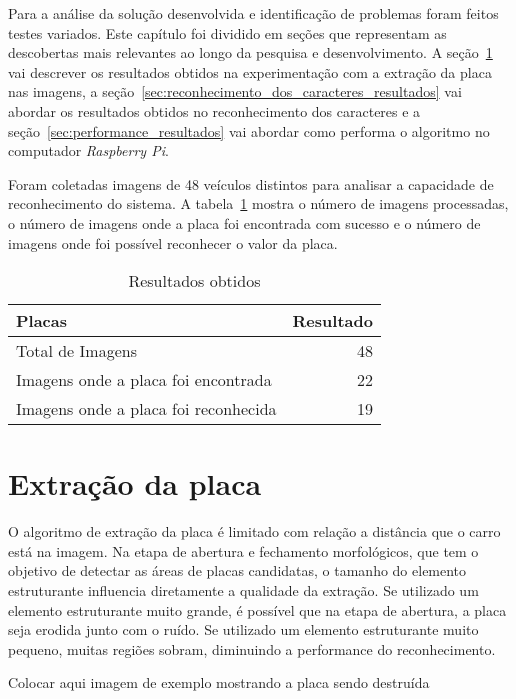 Para a análise da solução desenvolvida e identificação de problemas foram feitos
testes variados. Este capítulo foi dividido em seções que representam as
descobertas mais relevantes ao longo da pesquisa e desenvolvimento. A
seção~\ref{sec:extracao_da_placa_resultados} vai descrever os resultados obtidos
na experimentação com a extração da placa nas imagens, a
seção~\ref{sec:reconhecimento_dos_caracteres_resultados} vai abordar os
resultados obtidos no reconhecimento dos caracteres e a
seção~\ref{sec:performance_resultados} vai abordar como performa o algoritmo no
computador \emph{Raspberry Pi}.

Foram coletadas imagens de 48 veículos distintos para analisar a capacidade de
reconhecimento do sistema. A tabela~\ref{tab:resultados} mostra o número de
imagens processadas, o número de imagens onde a placa foi encontrada com sucesso
e o número de imagens onde foi possível reconhecer o valor da placa.

\begin{table}[]
\centering
\caption{Resultados obtidos}
\label{tab:resultados}
\begin{tabular}{@{}lr@{}}
\toprule
Placas                               & \multicolumn{1}{l}{Resultado} \\ \midrule
Total de Imagens                     & 48                           \\
Imagens onde a placa foi encontrada  & 22                            \\
Imagens onde a placa foi reconhecida & 19
\end{tabular}
\end{table}

\section{Extração da placa}
\label{sec:extracao_da_placa_resultados}


O algoritmo de extração da placa é limitado com relação a distância que o carro
está na imagem. Na etapa de abertura e fechamento morfológicos, que tem o
objetivo de detectar as áreas de placas candidatas, o tamanho do elemento
estruturante influencia diretamente a qualidade da extração. Se utilizado um
elemento estruturante muito grande, é possível que na etapa de abertura, a placa
seja erodida junto com o ruído. Se utilizado um elemento estruturante muito
pequeno, muitas regiões sobram, diminuindo a performance do reconhecimento.

Colocar aqui imagem de exemplo mostrando a placa sendo destruída


